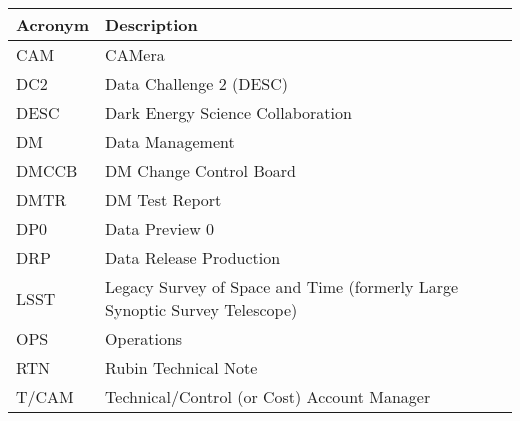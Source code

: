 \addtocounter{table}{-1}
\begin{longtable}{p{}p{}}\hline
\textbf{Acronym} & \textbf{Description}  \\\hline

CAM & CAMera \\\hline
DC2 & Data Challenge 2 (DESC) \\\hline
DESC & Dark Energy Science Collaboration \\\hline
DM & Data Management \\\hline
DMCCB & DM Change Control Board \\\hline
DMTR & DM Test Report \\\hline
DP0 & Data Preview 0 \\\hline
DRP & Data Release Production \\\hline
LSST & Legacy Survey of Space and Time (formerly Large Synoptic Survey Telescope) \\\hline
OPS & Operations \\\hline
RTN & Rubin Technical Note \\\hline
T/CAM & Technical/Control (or Cost) Account Manager \\\hline
\end{longtable}

